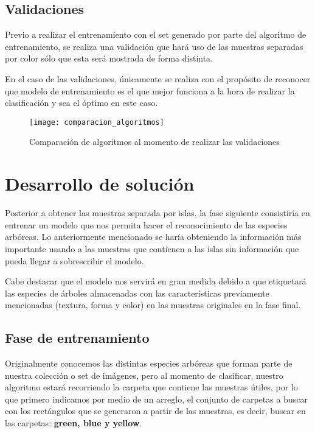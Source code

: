 \break

\section{Validaciones}

Previo a realizar el entrenamiento con el set generado por parte del algoritmo de entrenamiento, se realiza una validación que hará uso de las muestras separadas por color sólo que esta será mostrada de forma distinta.

En el caso de las validaciones, únicamente se realiza con el propósito de reconocer que modelo de entrenamiento es el que mejor funciona a la hora de realizar la clasificación y sea el óptimo en este caso. \\


\begin{figure}[h]
 \centering
\texttt{[image: comparacion\_algoritmos]}
\caption[Comparación de algoritmos]{Comparación de algoritmos al momento de realizar las validaciones}
\end{figure}

\break

\chapter{Desarrollo de solución}

Posterior a obtener las muestras separada por islas, la fase siguiente consistiría en entrenar un modelo que nos permita hacer el reconocimiento de las especies arbóreas. Lo anteriormente mencionado se haría obteniendo la información más importante usando a las muestras que contienen a las islas sin información que pueda llegar a sobrescribir el modelo.

Cabe destacar que el modelo nos servirá en gran medida debido a que etiquetará las especies de árboles almacenadas con las características previamente mencionadas (textura, forma y color) en las muestras originales en la fase final.

\section{Fase de entrenamiento}
Originalmente conocemos las distintas especies arbóreas que forman parte de nuestra colección o set de imágenes, pero al momento de clasificar, nuestro algoritmo estará recorriendo la carpeta que contiene las muestras útiles, por lo que primero indicamos por medio de un arreglo, el conjunto de carpetas a buscar con los rectángulos que se generaron a partir de las muestras, es decir, buscar en las carpetas: \textbf{green, blue y yellow}. \\

